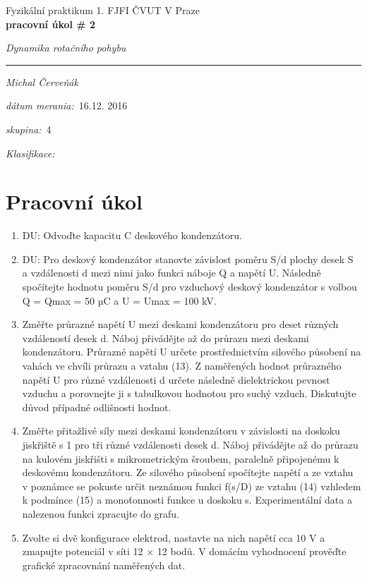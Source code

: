 \documentclass[a4paper,10pt]{article}
\begin{document}
\def\mean#1{\left< #1 \right>}
\noindent
{\large Fyzikální praktikum 1.} \hfil {\large FJFI ČVUT V Praze}\\
\noindent
{\large\textbf{pracovní úkol \# 2}}
\begin{center}
{\large\textit{Dynamika rotačního pohybu}}
\end{center}
\noindent
\rule{\textwidth}{1px}
\vspace{\baselineskip}

\emph{Michal Červeňák}
\par
\vspace{\baselineskip}
\begin{minipage}[l]{0.5\textwidth}%
\textit{dátum merania:}~16.12. 2016\\%
\par%
\noindent%
\textit{skupina:}~4\\%
\par%
\noindent%
\textit{Klasifikace:}\dotfill\\%
\end{minipage}

\section{Pracovní úkol}

\begin{enumerate}
\item DU: Odvoďte kapacitu C deskového kondenzátoru.
\item DU: Pro deskový kondenzátor stanovte závislost poměru S/d plochy desek S a
vzdálenosti d mezi nimi jako funkci náboje Q a napětí U. Následně spočítejte hodnotu poměru S/d
pro vzduchový deskový kondenzátor s volbou Q = Qmax = 50 µC a U = Umax = 100 kV.
\item Změřte průrazné napětí U mezi deskami kondenzátoru pro deset různých vzdáleností desek
d. Náboj přivádějte až do průrazu mezi deskami kondenzátoru. Průrazné napětí U určete
prostřednictvím silového působení na vahách ve chvíli průrazu a vztahu (13). Z naměřených hodnot
průrazného napětí U pro různé vzdálenosti d určete následně dielektrickou pevnost vzduchu
a porovnejte ji s tabulkovou hodnotou pro suchý vzduch. Diskutujte důvod případné odlišnosti
hodnot.
\item Změřte přitažlivé síly mezi deskami kondenzátoru v závislosti na doskoku jiskřiště s 1 pro tři
různé vzdálenosti desek d. Náboj přivádějte až do průrazu na kulovém jiskřišti s mikrometrickým
šroubem, paralelně připojenému k deskovému kondenzátoru. Ze silového působení spočítejte
napětí a ze vztahu v poznámce se pokuste určit neznámou funkci f(s/D) ze vztahu (14) vzhledem
k podmínce (15) a monoťonnosti funkce u doskoku s. Experimentální data a nalezenou funkci
zpracujte do grafu.
\item Zvolte si dvě konfigurace elektrod, nastavte na nich napětí cca 10 V a zmapujte potenciál v
síti 12 × 12 bodů. V domácím vyhodnocení prověďte grafické zpracovnání naměřených dat.
\end{enumerate}
\end{document}
